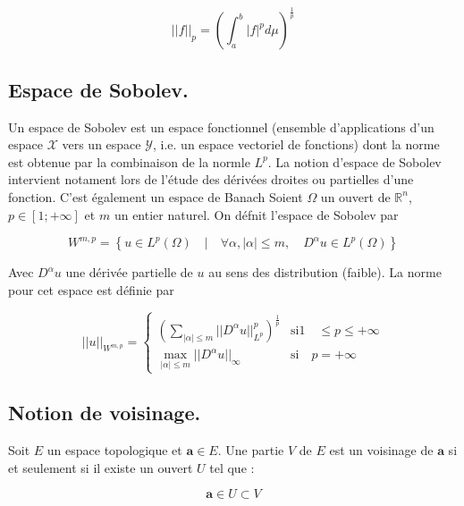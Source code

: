 \begin{equation}
    ||f||_{p} = \left( \int_{a}^{b} |f|^{p} d\mu \right)^{\frac{1}{p}}
\end{equation}

\subsection{Espace de Sobolev.}

\noindent Un espace de Sobolev est un espace fonctionnel (ensemble d'applications d'un espace $\mathcal{X}$ vers un espace $\mathcal{Y}$, i.e. un espace vectoriel de fonctions) dont la norme est obtenue par la combinaison de la normle $L^p$. La notion d'espace de Sobolev intervient notament lors de l'étude des dérivées droites ou partielles d'une fonction. C'est également un espace de Banach
Soient $\Omega$ un ouvert de $\mathbb{R}^n$, $p \in [1;+\infty]$ et $m$ un entier naturel. On défnit l'espace de Sobolev par 

\begin{equation}
    W^{m,p} = \left\{ u \in L^{p}(\Omega) \quad | \quad \forall \alpha, |\alpha| \le m, \quad D^{\alpha}u \in L^p(\Omega) \right\}
\end{equation}

\noindent Avec $D^{\alpha}u$ une dérivée partielle de $u$ au sens des distribution (faible). La norme pour cet espace est définie par 

\begin{equation}
    || u ||_{W^{m,p}} = 
    \begin{cases}
        \left( \sum_{|\alpha| \le m } || D^{\alpha}u ||_{L^{p}}^{p} \right) ^{\frac{1}{p}} & \text{si} 1 \quad \le p \le +\infty  \\
        \max_{|\alpha| \le m} || D^{\alpha}u ||_{\infty} & \text{si} \quad p = +\infty
    \end{cases}
\end{equation}

\subsection{Notion de voisinage.}

\noindent Soit $E$ un espace topologique et $\boldsymbol{a} \in E$. Une partie $V$ de $E$ est un voisinage de $\boldsymbol{a}$ si et seulement si il existe un ouvert $U$ tel que :

\begin{equation}
    \boldsymbol{a} \in U \subset V
\end{equation}

